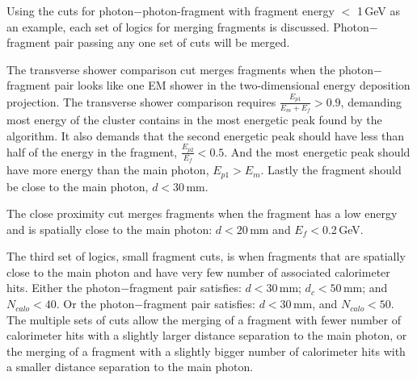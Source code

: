 Using the cuts for photon$-$photon-fragment with fragment energy $<$ 1\,GeV as an example,  each set of logics for merging fragments is discussed. Photon$-$fragment pair passing any one set of cuts will be merged.


The transverse shower comparison cut merges fragments when the photon$-$fragment pair looks like one EM shower in the two-dimensional energy deposition projection. The transverse shower comparison requires $\frac{E_{p1}}{E_m + E_f} > 0.9 $, demanding  most energy of the cluster contains in the most energetic peak found by the  \peakFinding algorithm. It also demands that the second energetic peak should have less than half of the energy in the fragment,  $\frac{E_{p2}}{E_f} < 0.5 $. And the most energetic peak should have more energy than the main photon,   $E_{p1} > E_m$. Lastly the fragment should be close to the main photon, $d < 30 $\,mm.



The close proximity cut merges fragments  when the fragment has a low energy and is spatially close to the main photon: $d < 20 $\,mm and  $E_f<$0.2\,GeV.



The third set of logics, small fragment cuts,  is when fragments that are spatially close to the main photon and have very few number of associated calorimeter hits. Either the  photon$-$fragment pair satisfies:  $d < 30 $\,mm; $d_c < 50 $\,mm; and $N_{calo}<40$. Or the  photon$-$fragment pair satisfies: $d < 30 $\,mm, and $N_{calo}<50$. The multiple sets of cuts allow the merging of a fragment with fewer number of  calorimeter hits with a slightly larger distance separation to the main photon, or the merging of a fragment with a slightly bigger number of  calorimeter hits with a smaller distance separation to the main photon.

